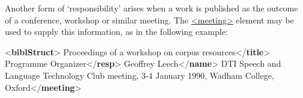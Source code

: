 Another form of ‘responsibility’ arises when a work is published as the outcome of a conference, workshop or similar meeting. The \hyperref[TEI.meeting]{<meeting>} element may be used to supply this information, as in the following example: \par\bgroup{}\exampleFont \begin{shaded}\noindent\mbox{}{<\textbf{biblStruct}>}\mbox{}\newline 
{}\mbox{}\newline 
\hspace*{1em}Proceedings of a workshop on corpus resources{</\textbf{title}>}\mbox{}\newline 
\hspace*{1em}\mbox{}\newline 
\hspace*{1em}\hspace*{1em}Programme Organizer{</\textbf{resp}>}\mbox{}\newline 
\hspace*{1em}\hspace*{1em}Geoffrey Leech{</\textbf{name}>}\mbox{}\newline 
\hspace*{1em}\mbox{}\newline 
\hspace*{1em}DTI Speech and Language Technology Club meeting, 3-4\mbox{}\newline 
\hspace*{1em}\hspace*{1em}\hspace*{1em}\hspace*{1em} January 1990, Wadham College, Oxford{</\textbf{meeting}>}\mbox{}\newline 

\end{shaded}
